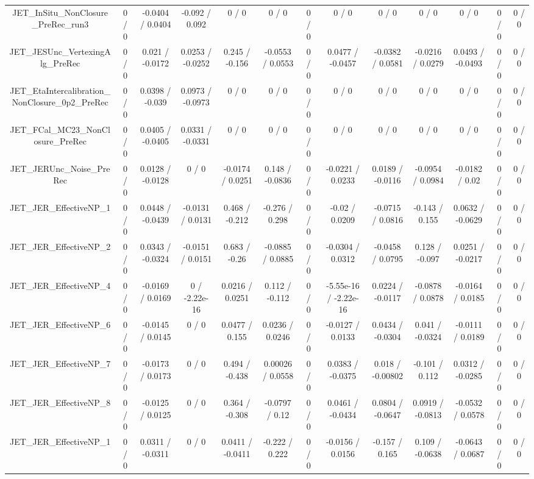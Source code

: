 \documentclass[10pt]{article}
\begin{document}
\begin{table}[htbp]
\begin{center}
\begin{tabular}{|c|c|c|c|c|c|c|c|c|c|c|c|c|}
  JET_InSitu_NonClosure_PreRec_run3 & 0 / 0 & -0.0404 / 0.0404 & -0.092 / 0.092 & 0 / 0 & 0 / 0 & 0 / 0 & 0 / 0 & 0 / 0 & 0 / 0 & 0 / 0 & 0 / 0 & 0 / 0 \\ 
  JET_JESUnc_VertexingAlg_PreRec & 0 / 0 & 0.021 / -0.0172 & 0.0253 / -0.0252 & 0.245 / -0.156 & -0.0553 / 0.0553 & 0 / 0 & 0.0477 / -0.0457 & -0.0382 / 0.0581 & -0.0216 / 0.0279 & 0.0493 / -0.0493 & 0 / 0 & 0 / 0 \\ 
  JET_EtaIntercalibration_NonClosure_0p2_PreRec & 0 / 0 & 0.0398 / -0.039 & 0.0973 / -0.0973 & 0 / 0 & 0 / 0 & 0 / 0 & 0 / 0 & 0 / 0 & 0 / 0 & 0 / 0 & 0 / 0 & 0 / 0 \\ 
  JET_FCal_MC23_NonClosure_PreRec & 0 / 0 & 0.0405 / -0.0405 & 0.0331 / -0.0331 & 0 / 0 & 0 / 0 & 0 / 0 & 0 / 0 & 0 / 0 & 0 / 0 & 0 / 0 & 0 / 0 & 0 / 0 \\ 
  JET_JERUnc_Noise_PreRec & 0 / 0 & 0.0128 / -0.0128 & 0 / 0 & -0.0174 / 0.0251 & 0.148 / -0.0836 & 0 / 0 & -0.0221 / 0.0233 & 0.0189 / -0.0116 & -0.0954 / 0.0984 & -0.0182 / 0.02 & 0 / 0 & 0 / 0 \\ 
  JET_JER_EffectiveNP_1 & 0 / 0 & 0.0448 / -0.0439 & -0.0131 / 0.0131 & 0.468 / -0.212 & -0.276 / 0.298 & 0 / 0 & -0.02 / 0.0209 & -0.0715 / 0.0816 & -0.143 / 0.155 & 0.0632 / -0.0629 & 0 / 0 & 0 / 0 \\ 
  JET_JER_EffectiveNP_2 & 0 / 0 & 0.0343 / -0.0324 & -0.0151 / 0.0151 & 0.683 / -0.26 & -0.0885 / 0.0885 & 0 / 0 & -0.0304 / 0.0312 & -0.0458 / 0.0795 & 0.128 / -0.097 & 0.0251 / -0.0217 & 0 / 0 & 0 / 0 \\ 
  JET_JER_EffectiveNP_4 & 0 / 0 & -0.0169 / 0.0169 & 0 / -2.22e-16 & 0.0216 / 0.0251 & 0.112 / -0.112 & 0 / 0 & -5.55e-16 / -2.22e-16 & 0.0224 / -0.0117 & -0.0878 / 0.0878 & -0.0164 / 0.0185 & 0 / 0 & 0 / 0 \\ 
  JET_JER_EffectiveNP_6 & 0 / 0 & -0.0145 / 0.0145 & 0 / 0 & 0.0477 / 0.155 & 0.0236 / 0.0246 & 0 / 0 & -0.0127 / 0.0133 & 0.0434 / -0.0304 & 0.041 / -0.0324 & -0.0111 / 0.0189 & 0 / 0 & 0 / 0 \\ 
  JET_JER_EffectiveNP_7 & 0 / 0 & -0.0173 / 0.0173 & 0 / 0 & 0.494 / -0.438 & 0.00026 / 0.0558 & 0 / 0 & 0.0383 / -0.0375 & 0.018 / -0.00802 & -0.101 / 0.112 & 0.0312 / -0.0285 & 0 / 0 & 0 / 0 \\ 
  JET_JER_EffectiveNP_8 & 0 / 0 & -0.0125 / 0.0125 & 0 / 0 & 0.364 / -0.308 & -0.0797 / 0.12 & 0 / 0 & 0.0461 / -0.0434 & 0.0804 / -0.0647 & 0.0919 / -0.0813 & -0.0532 / 0.0578 & 0 / 0 & 0 / 0 \\ 
  JET_JER_EffectiveNP_1 & 0 / 0 & 0.0311 / -0.0311 & 0 / 0 & 0.0411 / -0.0411 & -0.222 / 0.222 & 0 / 0 & -0.0156 / 0.0156 & -0.157 / 0.165 & 0.109 / -0.0638 & -0.0643 / 0.0687 & 0 / 0 & 0 / 0 \\ 

\end{tabular}
\end{center}
\end{table}
\end{document}

